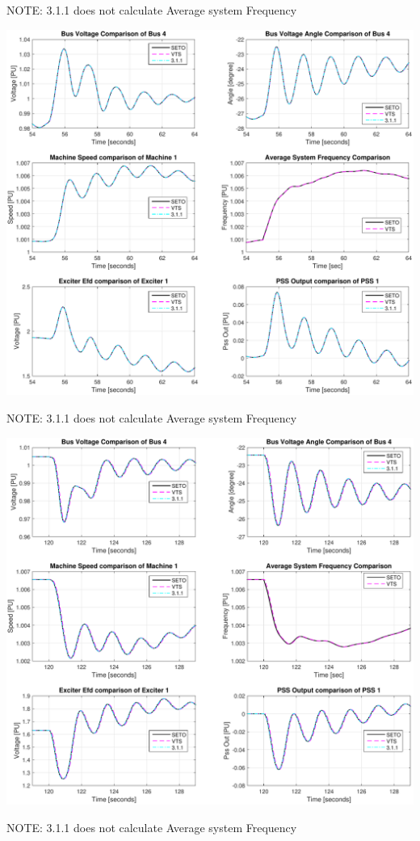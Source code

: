 \documentclass[12pt]{article}
\begin{document}
NOTE: 3.1.1 does not calculate Average system Frequency

\includegraphics[width=\linewidth]{verCompDetail1}

NOTE: 3.1.1 does not calculate Average system Frequency

\includegraphics[width=\linewidth]{verCompDetail2}

NOTE: 3.1.1 does not calculate Average system Frequency
\end{document}
